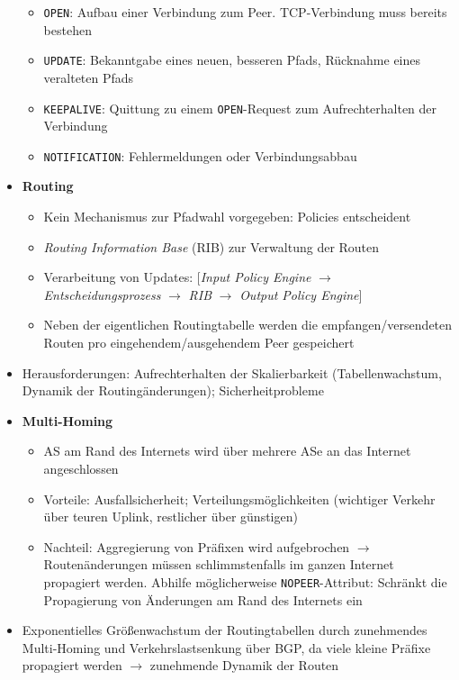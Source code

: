 \begin{itemize}
	\begin{itemize}
		\item \texttt{OPEN}: Aufbau einer Verbindung zum Peer. TCP-Verbindung muss bereits bestehen
		\item \texttt{UPDATE}: Bekanntgabe eines neuen, besseren Pfads, Rücknahme eines veralteten Pfads
		\item \texttt{KEEPALIVE}: Quittung zu einem \texttt{OPEN}-Request zum Aufrechterhalten der Verbindung
		\item \texttt{NOTIFICATION}: Fehlermeldungen oder Verbindungsabbau
	\end{itemize}
	\item \textbf{Routing}
	\begin{itemize}
		\item Kein Mechanismus zur Pfadwahl vorgegeben: Policies entscheident
		\item \textit{Routing Information Base} (RIB) zur Verwaltung der Routen
		\item Verarbeitung von Updates: \(\big\lbrack\)\textit{Input Policy Engine} \(\rightarrow\) \textit{Entscheidungsprozess} \(\rightarrow\) \textit{RIB} \(\rightarrow\) \textit{Output Policy Engine}\(\big\rbrack\)
		\item Neben der eigentlichen Routingtabelle werden die empfangen/versendeten Routen pro eingehendem/ausgehendem Peer gespeichert
	\end{itemize}
	\item Herausforderungen: Aufrechterhalten der Skalierbarkeit (Tabellenwachstum, Dynamik der Routingänderungen); Sicherheitprobleme
	\item \textbf{Multi-Homing}
	\begin{itemize}
		\item AS am Rand des Internets wird über mehrere ASe an das Internet angeschlossen
		\item Vorteile: Ausfallsicherheit; Verteilungsmöglichkeiten (wichtiger Verkehr über teuren Uplink, restlicher über günstigen)
		\item Nachteil: Aggregierung von Präfixen wird aufgebrochen \(\rightarrow\) Routenänderungen müssen schlimmstenfalls im ganzen Internet propagiert werden. Abhilfe möglicherweise \texttt{NOPEER}-Attribut: Schränkt die Propagierung von Änderungen am Rand des Internets ein
	\end{itemize}
	\item Exponentielles Größenwachstum der Routingtabellen durch zunehmendes Multi-Homing und Verkehrslastsenkung über BGP, da viele kleine Präfixe propagiert werden \(\rightarrow\) zunehmende Dynamik der Routen

\end{itemize}
